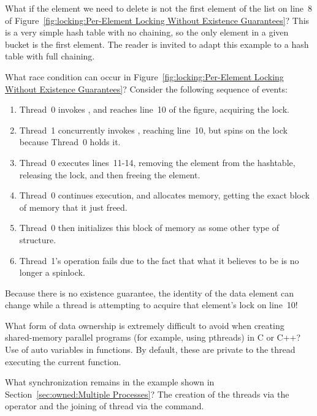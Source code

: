 \begin{enumerate}
\QuickQ{}
	What if the element we need to delete is not the first element
	of the list on line~8 of
	Figure~\ref{fig:locking:Per-Element Locking Without Existence Guarantees}?
\QuickA{}
	This is a very simple hash table with no chaining, so the only
	element in a given bucket is the first element.
	The reader is invited to adapt this example to a hash table with
	full chaining.

\QuickQ{}
	What race condition can occur in
	Figure~\ref{fig:locking:Per-Element Locking Without Existence Guarantees}?
\QuickA{}
	Consider the following sequence of events:
	\begin{enumerate}
	\item	Thread~0 invokes , and reaches line~10 of
		the figure, acquiring the lock.
	\item	Thread~1 concurrently invokes , reaching
		line~10, but spins on the lock because Thread~0 holds it.
	\item	Thread~0 executes lines~11-14, removing the element from
		the hashtable, releasing the lock, and then freeing the
		element.
	\item	Thread~0 continues execution, and allocates memory, getting
		the exact block of memory that it just freed.
	\item	Thread~0 then initializes this block of memory as some
		other type of structure.
	\item	Thread~1's  operation fails due to the
		fact that what it believes to be  is no longer
		a spinlock.
	\end{enumerate}
	Because there is no existence guarantee, the identity of the
	data element can change while a thread is attempting to acquire
	that element's lock on line~10!

\QuickQ{}
	What form of data ownership is extremely difficult
	to avoid when creating shared-memory parallel programs
	(for example, using pthreads) in C or C++?
\QuickA{}
	Use of auto variables in functions.
	By default, these are private to the thread executing the
	current function.

\QuickQ{}
	What synchronization remains in the example shown in
	Section~\ref{sec:owned:Multiple Processes}?
\QuickA{}
	The creation of the threads via the  \co{&} operator
	and the joining of thread via the  
	command.


\end{enumerate}
